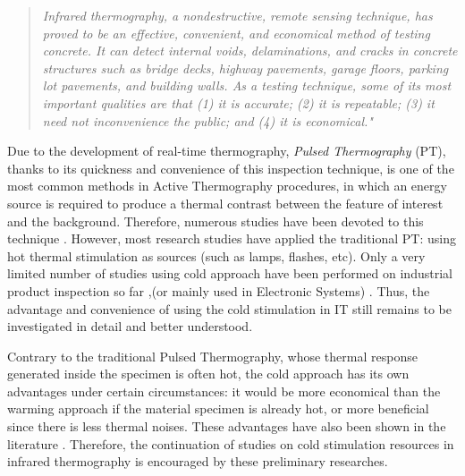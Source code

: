 \begin{quote}
	\textit{Infrared thermography, a nondestructive, remote sensing technique, has proved to be an effective, convenient, and economical method of testing concrete. It can detect internal voids, delaminations, and cracks in concrete structures such as bridge decks, highway pavements, garage floors, parking lot pavements, and building walls. As a testing technique, some of its most important qualities are that (1) it is accurate; (2) it is repeatable; (3) it need not inconvenience the public; and (4) it is economical."}\citep{malhotra2004handbook}
\end{quote} 

Due to the development of real-time thermography, \textit{Pulsed Thermography} (PT), thanks to its quickness and convenience of this inspection technique, is one of the most common methods in Active Thermography procedures, in which an energy source is required to produce a thermal contrast between the feature of interest and the background.  Therefore, numerous studies have been devoted to this technique \citep{Mayr2011active,Maldague1993Nondestructive,Maldague1994bInfra,Maldague2002intro,Maldague2004Double,2007-Ibarra-Castanedo,2011-ClementeIbarra-Castanedo,2007-ClementeIbarra-Castanedo,shoja2011inspection,duan2013quantitative,vahiddefect2014}. However, most research studies have applied the traditional PT: using hot thermal stimulation as sources (such as lamps, flashes, etc). Only a very limited number of studies using cold approach have been performed on industrial product inspection so far \citep{Maldague1993Nondestructive,Maldague1994bInfra,endohdynamical2012},(or mainly used in Electronic Systems) \citep{2012-LewisHom}. Thus, the advantage and convenience of using the cold stimulation in IT still remains to be investigated in detail and better understood.

Contrary to the traditional Pulsed Thermography, whose thermal response generated inside the specimen is often hot, the cold approach has its own advantages under certain circumstances: it would be more economical than the warming approach if the material specimen is already hot, or more beneficial since there is less thermal noises. These advantages have also been shown in the literature \citep{Maldague1993Nondestructive,Maldague1994bInfra,endohdynamical2012}. Therefore, the continuation of studies on cold stimulation resources in infrared thermography is encouraged by these preliminary researches.